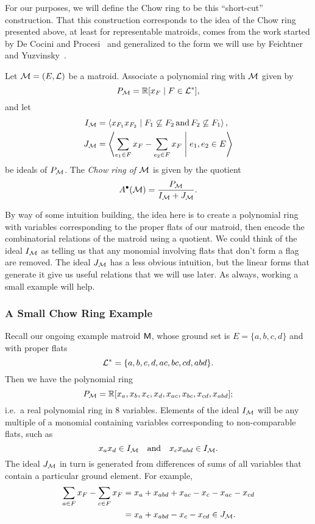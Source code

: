 \documentclass[12pt,oneside]{../../sfsuthesis}
\begin{document}
For our purposes, we will define the Chow ring to be this ``short-cut'' construction.
That this construction corresponds to the idea of the Chow ring presented above, at least for representable matroids, comes from the work started by De Cocini and Procesi~\cite{deconciniWonderfulModelsSubspace1995} and generalized to the form we will use by Feichtner and Yuzvinsky~\cite{feichtnerChowRingsToric2004}.
\begin{definition}\label{def:chowRing}
    Let \( \mathcal{M} = (E, \mathcal{L})\) be a matroid.
    Associate a polynomial ring with \( \mathcal{M} \) given by
    \[
        P_{\mathcal{M}} = \mathbb{R}[x_F \; | \; F \in \mathcal{L}^\ast],
    \]
    and let
    \begin{align*}
        I_{\mathcal{M}} & = \left\langle x_{F_1}x_{F_2} \; \middle| \; F_1 \not\subseteq F_2\, \text{and}\, F_2 \not\subseteq F_1 \right\rangle, \\
        J_{\mathcal{M}} & = \left\langle \sum_{e_1 \in F} x_{F} - \sum_{e_2 \in F} x_{F} \; \middle| \; e_1, e_2 \in E \right\rangle
    \end{align*}
    be ideals of \(P_{\mathcal{M}}\).
    The \emph{Chow ring of \( \mathcal{M} \)} is given by the quotient
    \[
        A^{\bullet}(\mathcal{M}) = \frac{P_{\mathcal{M}}}{I_{\mathcal{M}} + J_{\mathcal{M}}}.
    \]
\end{definition}

By way of some intuition building, the idea here is to create a polynomial ring with variables corresponding to the proper flats of our matroid, then encode the combinatorial relations of the matroid using a quotient.
We could think of the ideal \( I_{\mathcal{M}} \) as telling us that any monomial involving flats that don't form a flag are removed.
The ideal \( J_{\mathcal{M}} \) has a less obvious intuition, but the linear forms that generate it give us useful relations that we will use later.
As always, working a small example will help.

\subsubsection{A Small Chow Ring Example}
Recall our ongoing example matroid \( \mathsf{M} \), whose ground set is \( E = \{ a,b,c,d \} \) and with proper flats
\[
    \mathcal{L}^\ast = \{ a, b, c, d, ac, bc, cd, abd \}.
\]
Then we have the polynomial ring
\[
    P_{\mathcal{M}} = \mathbb{R}[x_{a}, x_{b}, x_{c}, x_{d}, x_{ac}, x_{bc}, x_{cd}, x_{abd}];
\]
i.e.\ a real polynomial ring in 8 variables.
Elements of the ideal \( I_{\mathcal{M}} \) will be any multiple of a monomial containing variables corresponding to non-comparable flats, such as
\[
    x_a x_d \in I_{\mathcal{M}} \quad \text{and} \quad x_c x_{abd} \in I_{\mathcal{M}}.
\]
The ideal \( J_{\mathcal{M}} \) in turn is generated from differences of sums of all variables that contain a particular ground element. For example,
\begin{align*}
    \sum_{a \in F}x_F - \sum_{c \in F}x_F & = x_a + x_{abd} + x_{ac} - x_c - x_{ac} - x_{cd} \\
                                          & = x_a + x_{abd} - x_c - x_{cd} \in J_{\mathcal{M}}.
\end{align*}
\end{document}
